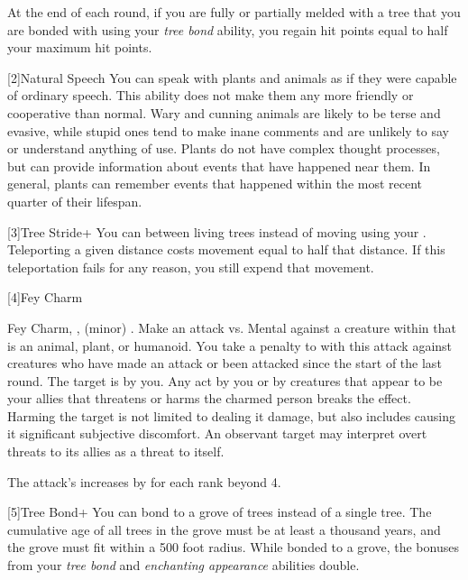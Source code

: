       At the end of each round, if you are fully or partially melded with a tree that you are bonded with using your \textit{tree bond} ability, you regain hit points equal to half your maximum hit points.

    [2]{Natural Speech} You can speak with plants and animals as if they were capable of ordinary speech.
      This ability does not make them any more friendly or cooperative than normal.
      Wary and cunning animals are likely to be terse and evasive, while stupid ones tend to make inane comments and are unlikely to say or understand anything of use.
      Plants do not have complex thought processes, but can provide information about events that have happened near them.
      In general, plants can remember events that happened within the most recent quarter of their lifespan.

    [3]{Tree Stride+} You can  between living trees instead of moving using your .
      Teleporting a given distance costs movement equal to half that distance.
      If this teleportation fails for any reason, you still expend that movement.

    [4]{Fey Charm}
      \begin{magicalsustainability}{Fey Charm}{, ,  (minor)}
        \abilityusagetime {}.
        \rankline
        Make an attack vs. Mental against a creature within \medrange that is an animal, plant, or humanoid.
        You take a  penalty to  with this attack against creatures who have made an attack or been attacked since the start of the last round.
        \hit The target is \charmed by you.
        Any act by you or by creatures that appear to be your allies that threatens or harms the charmed person breaks the effect.
        Harming the target is not limited to dealing it damage, but also includes causing it significant subjective discomfort.
        An observant target may interpret overt threats to its allies as a threat to itself.

        \rankline

        \noindent The attack's  increases by  for each rank beyond 4.
      \end{magicalsustainability}

    [5]{Tree Bond+} You can bond to a grove of trees instead of a single tree.
      The cumulative age of all trees in the grove must be at least a thousand years, and the grove must fit within a 500 foot radius.
      While bonded to a grove, the bonuses from your \textit{tree bond} and \textit{enchanting appearance} abilities double.

